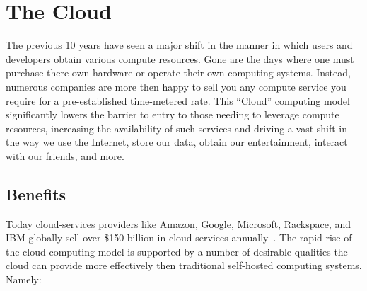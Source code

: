 \section{The Cloud}

The previous 10 years have seen a major shift in the manner in which
users and developers obtain various compute resources. Gone are the
days where one must purchase there own hardware or operate their own
computing systems. Instead, numerous companies are more then happy to
sell you any compute service you require for a pre-established
time-metered rate. This ``Cloud'' computing model significantly lowers
the barrier to entry to those needing to leverage compute resources,
increasing the availability of such services and driving a vast shift
in the way we use the Internet, store our data, obtain our
entertainment, interact with our friends, and more.

\subsection{Benefits}

Today cloud-services providers like Amazon, Google, Microsoft,
Rackspace, and IBM globally sell over \$150 billion in cloud services
annually~\cite{flood2013}. The rapid rise of the cloud computing model
is supported by a number of desirable qualities the cloud can provide
more effectively then traditional self-hosted computing
systems. Namely:

